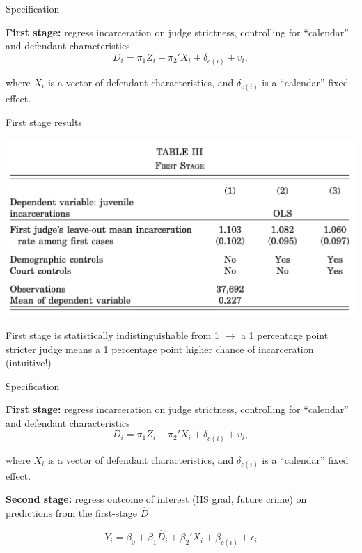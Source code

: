 \documentclass[11pt,english,handout]{beamer}
\newenvironment{wideitemize}{\itemize\addtolength{\itemsep}{10pt}}{\enditemize}
\begin{document}
\begin{frame}{Specification}
	\begin{wideitemize}
		\item
		\textbf{First stage:} regress incarceration on judge strictness, controlling for ``calendar'' and defendant characteristics
		$$D_{i} =  \pi_1 Z_i + \pi_2' X_i + \delta_{c(i)} + v_i ,$$
		
		\noindent where $X_i$ is a vector of defendant characteristics, and $\delta_{c(i)}$ is a ``calendar'' fixed effect.
		

	\end{wideitemize}
\end{frame}

\begin{frame}{First stage results}
	\begin{center}
		\includegraphics[width=0.7 \linewidth]{first-stage}
	\end{center}

\pause 
First stage is statistically indistinguishable from 1 $\rightarrow$ a 1 percentage point stricter judge means a 1 percentage point higher chance of incarceration (intuitive!)
\end{frame}

\begin{frame}{Specification}
	\begin{wideitemize}
		\item
		\textbf{First stage:} regress incarceration on judge strictness, controlling for ``calendar'' and defendant characteristics
		$$D_{i} =  \pi_1 Z_i + \pi_2' X_i + \delta_{c(i)} + v_i ,$$
		
		\noindent where $X_i$ is a vector of defendant characteristics, and $\delta_{c(i)}$ is a ``calendar'' fixed effect.

\pause

	\item
	\textbf{Second stage:} regress outcome of interest (HS grad, future crime) on predictions from the first-stage $\hat{D}$
	
	$$ Y_{i} = \beta_0 + \beta_1 \hat{D}_i + \beta_2'X_i + \beta_{c(i)}+ \epsilon_i $$		
		
	\end{wideitemize}
\end{frame}
\end{document}
